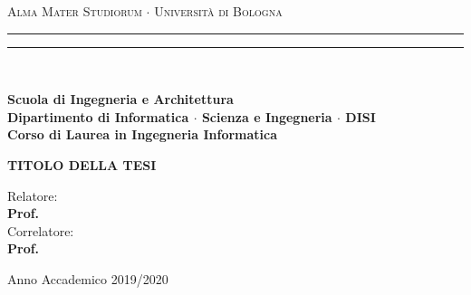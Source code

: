 \documentclass[12pt,a4paper]{report}
\begin{document}
\begin{titlepage}

\begin{center}
{{\Large{\textsc{Alma Mater Studiorum $\cdot$ Universit\`a di Bologna}}}} 
\rule[0.1cm]{15.8cm}{0.1mm}
\rule[0.5cm]{15.8cm}{0.6mm}
\\\vspace{3mm}

{\small{\bf Scuola di Ingegneria e Architettura \\ 
Dipartimento di Informatica $\cdot$ Scienza e Ingegneria $\cdot$ DISI\\
Corso di Laurea in Ingegneria Informatica}}


\end{center}

\vspace{23mm}

\begin{center}{
\large \bf TITOLO DELLA TESI\par
}\end{center}

\vspace{40mm} \par \noindent

\begin{minipage}[t]{0.47\textwidth}{
    \large{
        Relatore:
        \vspace{2mm}\\{
            \bf Prof. 
        }
        \vspace{6mm}\\
        {
            Correlatore:
            \vspace{2mm}\\
            \bf Prof.
        }
    }
}
\end{minipage}
%
\hfill
%
\begin{minipage}[t]{0.47\textwidth}
\end{minipage}

\vspace{40mm}

\begin{center}
Anno Accademico 2019/2020
\end{center}

\end{titlepage}
\end{document}
